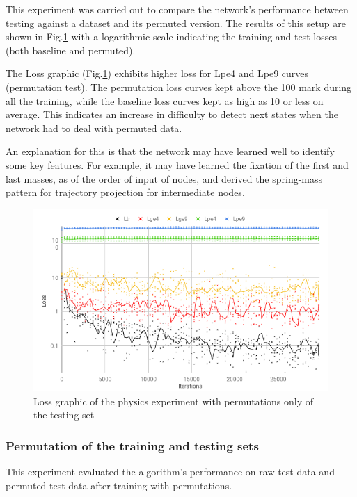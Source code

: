 This experiment was carried out to compare the network’s performance between testing against a dataset and its permuted version. The results of this setup are shown in Fig.\ref{fig:physics_base_results} with a logarithmic scale indicating the training and test losses (both baseline and permuted).

The Loss graphic (Fig.\ref{fig:physics_base_results}) exhibits higher loss for Lpe4 and Lpe9 curves (permutation test). The permutation loss curves kept above the 100 mark during all the training, while the baseline loss curves kept as high as 10 or less on average. This indicates an increase in difficulty to detect next states when the network had to deal with permuted data.

An explanation for this is that the network may have learned well to identify some key features. For example, it may have learned the fixation of the first and last masses, as of the order of input of nodes, and derived the spring-mass pattern for trajectory projection for intermediate nodes.

\begin{figure}[H]
    \centering
    \includegraphics[width=.9\linewidth]{fig/content/results/physics/physics_base.png}
    \caption{Loss graphic of the physics experiment with permutations only of the testing set}
    \label{fig:physics_base_results}
\end{figure}

\subsubsection {Permutation of the training and testing sets}

This experiment evaluated the algorithm’s performance on raw test data and permuted test data after training with permutations.

